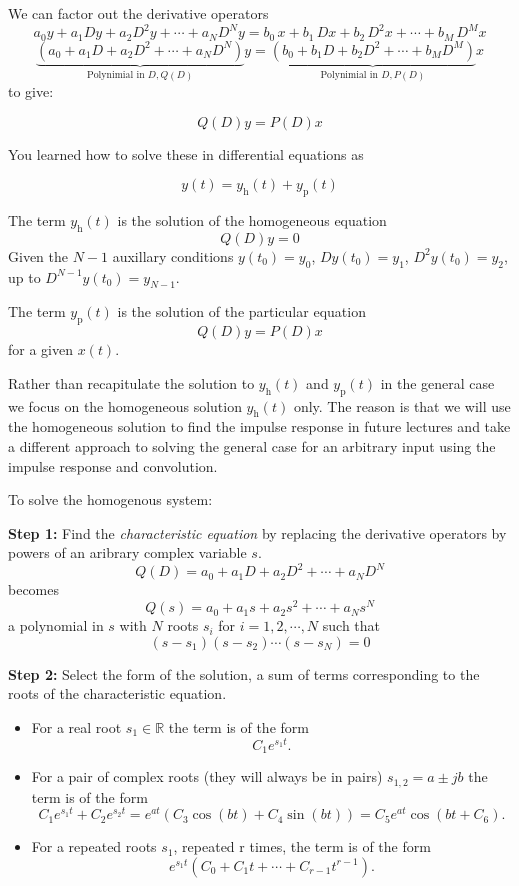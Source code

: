 We can factor out the derivative operators
\[
a_0y + a_1Dy + a_2D^2y + \cdots + a_ND^Ny  = b_0\, x + b_1\, Dx + b_2\, D^2x + \cdots + b_M\, D^M x
\]
\[
\underbrace{\left(a_0 + a_1D + a_2D^2 + \cdots + a_ND^N\right)}_{\text{Polynimial in } D, Q(D)} y = \underbrace{\left(b_0 + b_1 D + b_2 D^2 + \cdots + b_M D^M\right)}_{\text{Polynimial in } D, P(D)} x
\]
to give:
  
\[
Q(D)y = P(D)x
\]

You learned how to solve these in differential equations as

\[
y(t) = y_\text{h}(t) + y_\text{p}(t)
\]

The term $y_\text{h}(t)$ is the solution of the homogeneous equation
\[
Q(D)y = 0
\]
Given the $N-1$ auxillary conditions $y(t_0) = y_0$, $Dy(t_0) = y_1$, $D^2y(t_0) = y_2$, up to $D^{N-1}y(t_0) = y_{N-1}$.

The term $y_\text{p}(t)$ is the solution of the particular equation
\[
Q(D)y = P(D)x
\]
for a given $x(t)$.

Rather than recapitulate the solution to $y_\text{h}(t)$ and $y_\text{p}(t)$ in the general case we focus on the homogeneous solution $y_\text{h}(t)$ only. The reason is that we will use the homogeneous solution to find the impulse response in future lectures and take a different approach to solving the general case for an arbitrary input using the impulse response and convolution.

To solve the homogenous system:

\textbf{Step 1:} Find the \emph{characteristic equation} by replacing the derivative operators by powers of an aribrary complex variable $s$.
\[
Q(D) = a_0 + a_1D + a_2D^2 + \cdots + a_ND^N
\]
becomes
\[
Q(s) = a_0 + a_1s + a_2s^2 + \cdots + a_Ns^N
\]
a polynomial in $s$ with $N$ roots $s_i$ for $i = 1, 2, \cdots, N$ such that
\[
(s - s_1)(s-s_2)\cdots(s-s_N) = 0
\]

\textbf{Step 2:} Select the form of the solution, a sum of terms corresponding to the roots of the characteristic equation.

\begin{itemize}
\item For a real root $s_1\in \mathbb{R}$ the term is of the form
  \[
  C_1 e^{s_1 t}.
  \]
\item For a pair of complex roots (they will always be in pairs) $s_{1,2} = a \pm jb$ the term is of the form
  \[
  C_1 e^{s_1 t} + C_2 e^{s_2 t} = e^{a t}\left(C_3\cos(bt) + C_4\sin(bt)\right) = C_5 e^{a t}\cos(bt + C_6).
  \]
\item For a repeated roots $s_1$, repeated r times, the term is of the form
  \[
  e^{s_1 t} (C_0 + C_1 t + \cdots + C_{r-1} t^{r-1}).\]
\end{itemize}

